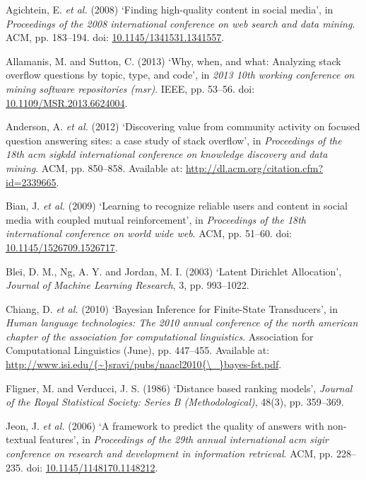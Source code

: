 \documentclass[11pt,preprint, authoryear]{article}
\numberwithin{equation}{section}
\begin{document}
\hypertarget{refs}{}
\hypertarget{ref-Agichtein2008}{}
Agichtein, E. \emph{et al.} (2008) `Finding high-quality content in
social media', in \emph{Proceedings of the 2008 international conference
on web search and data mining}. ACM, pp. 183--194. doi:
\href{https://doi.org/10.1145/1341531.1341557}{10.1145/1341531.1341557}.

\hypertarget{ref-Allamanis2013}{}
Allamanis, M. and Sutton, C. (2013) `Why, when, and what: Analyzing
stack overflow questions by topic, type, and code', in \emph{2013 10th
working conference on mining software repositories (msr)}. IEEE, pp.
53--56. doi:
\href{https://doi.org/10.1109/MSR.2013.6624004}{10.1109/MSR.2013.6624004}.

\hypertarget{ref-Anderson2012}{}
Anderson, A. \emph{et al.} (2012) `Discovering value from community
activity on focused question answering sites: a case study of stack
overflow', in \emph{Proceedings of the 18th acm sigkdd international
conference on knowledge discovery and data mining}. ACM, pp. 850--858.
Available at: \url{http://dl.acm.org/citation.cfm?id=2339665}.

\hypertarget{ref-Bian2009}{}
Bian, J. \emph{et al.} (2009) `Learning to recognize reliable users and
content in social media with coupled mutual reinforcement', in
\emph{Proceedings of the 18th international conference on world wide
web}. ACM, pp. 51--60. doi:
\href{https://doi.org/10.1145/1526709.1526717}{10.1145/1526709.1526717}.

\hypertarget{ref-Blei2003}{}
Blei, D. M., Ng, A. Y. and Jordan, M. I. (2003) `Latent Dirichlet
Allocation', \emph{Journal of Machine Learning Research}, 3, pp.
993--1022.

\hypertarget{ref-Chiang2010}{}
Chiang, D. \emph{et al.} (2010) `Bayesian Inference for Finite-State
Transducers', in \emph{Human language technologies: The 2010 annual
conference of the north american chapter of the association for
computational linguistics}. Association for Computational Linguistics
(June), pp. 447--455. Available at:
\href{http://www.isi.edu/\%7B~\%7Dsravi/pubs/naacl2010\%7B/_\%7Dbayes-fst.pdf}{http://www.isi.edu/\{\textasciitilde{}\}sravi/pubs/naacl2010\{\textbackslash{}\_\}bayes-fst.pdf}.

\hypertarget{ref-Fligner1986}{}
Fligner, M. and Verducci, J. S. (1986) `Distance based ranking models',
\emph{Journal of the Royal Statistical Society: Series B
(Methodological)}, 48(3), pp. 359--369.

\hypertarget{ref-Jeon2006}{}
Jeon, J. \emph{et al.} (2006) `A framework to predict the quality of
answers with non-textual features', in \emph{Proceedings of the 29th
annual international acm sigir conference on research and development in
information retrieval}. ACM, pp. 228--235. doi:
\href{https://doi.org/10.1145/1148170.1148212}{10.1145/1148170.1148212}.
\end{document}
